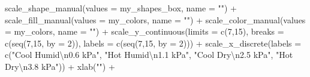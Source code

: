 \documentclass[
]{article}
\newenvironment{Shaded}{\begin{snugshade}}{\end{snugshade}}
\newcommand{\AttributeTok}[1]{\textcolor[rgb]{0.77,0.63,0.00}{#1}}
\newcommand{\DecValTok}[1]{\textcolor[rgb]{0.00,0.00,0.81}{#1}}
\newcommand{\FunctionTok}[1]{\textcolor[rgb]{0.00,0.00,0.00}{#1}}
\newcommand{\NormalTok}[1]{#1}
\newcommand{\SpecialCharTok}[1]{\textcolor[rgb]{0.00,0.00,0.00}{#1}}
\newcommand{\StringTok}[1]{\textcolor[rgb]{0.31,0.60,0.02}{#1}}
\begin{document}
\begin{Shaded}
\begin{Highlighting}[]
  \FunctionTok{scale\_shape\_manual}\NormalTok{(}\AttributeTok{values =}\NormalTok{ my\_shapes\_box, }\AttributeTok{name =} \StringTok{""}\NormalTok{) }\SpecialCharTok{+}
  \FunctionTok{scale\_fill\_manual}\NormalTok{(}\AttributeTok{values =}\NormalTok{ my\_colors, }\AttributeTok{name =} \StringTok{""}\NormalTok{) }\SpecialCharTok{+}
  \FunctionTok{scale\_color\_manual}\NormalTok{(}\AttributeTok{values =}\NormalTok{ my\_colors, }\AttributeTok{name =} \StringTok{""}\NormalTok{) }\SpecialCharTok{+}
  \FunctionTok{scale\_y\_continuous}\NormalTok{(}\AttributeTok{limits =} \FunctionTok{c}\NormalTok{(}\DecValTok{7}\NormalTok{,}\DecValTok{15}\NormalTok{),}
                     \AttributeTok{breaks =} \FunctionTok{c}\NormalTok{(}\FunctionTok{seq}\NormalTok{(}\DecValTok{7}\NormalTok{,}\DecValTok{15}\NormalTok{, }\AttributeTok{by =} \DecValTok{2}\NormalTok{)),}
                     \AttributeTok{labels =} \FunctionTok{c}\NormalTok{(}\FunctionTok{seq}\NormalTok{(}\DecValTok{7}\NormalTok{,}\DecValTok{15}\NormalTok{, }\AttributeTok{by =} \DecValTok{2}\NormalTok{))) }\SpecialCharTok{+}
  \FunctionTok{scale\_x\_discrete}\NormalTok{(}\AttributeTok{labels =} \FunctionTok{c}\NormalTok{(}\StringTok{"Cool Humid}\SpecialCharTok{\textbackslash{}n}\StringTok{0.6 kPa"}\NormalTok{,}
                               \StringTok{"Hot Humid}\SpecialCharTok{\textbackslash{}n}\StringTok{1.1 kPa"}\NormalTok{,}
                               \StringTok{"Cool Dry}\SpecialCharTok{\textbackslash{}n}\StringTok{2.5 kPa"}\NormalTok{,}
                               \StringTok{"Hot Dry}\SpecialCharTok{\textbackslash{}n}\StringTok{3.8 kPa"}\NormalTok{)) }\SpecialCharTok{+} 
  \FunctionTok{xlab}\NormalTok{(}\StringTok{""}\NormalTok{) }\SpecialCharTok{+} 
  

\end{Highlighting}
\end{Shaded}
\end{document}
